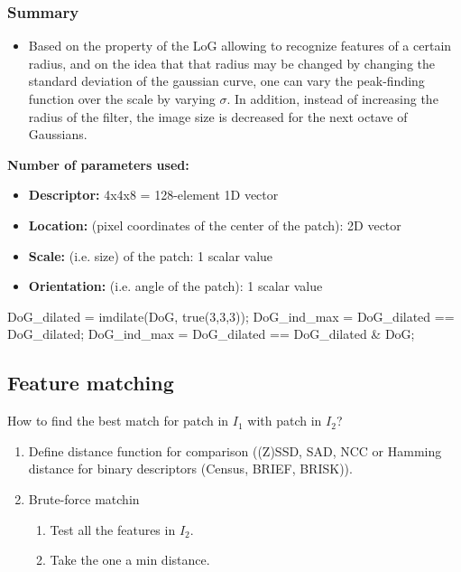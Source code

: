 \documentclass[10pt,a4paper]{scrartcl}
\begin{document}
\begin{multicols*}{2}
\subsubsection{Summary}

\begin{itemize}
\item Based on the property of the LoG allowing to recognize features of a certain radius, and on the idea that that radius may be changed by changing the standard deviation of the gaussian curve, one can vary the peak-finding function over the scale by varying $\sigma$. In addition, instead of increasing the radius of the filter, the image size is decreased for the next octave of Gaussians.
\end{itemize}

\textbf{Number of parameters used:}

\begin{itemize}
\item \textbf{Descriptor:} 4x4x8 = 128-element 1D vector
\item \textbf{Location:} (pixel coordinates of the center of the patch): 2D vector
\item \textbf{Scale:} (i.e. size) of the patch: 1 scalar value
\item \textbf{Orientation:} (i.e. angle of the patch): 1 scalar value
\end{itemize}

\begin{TPMatlab}
DoG_dilated = imdilate(DoG, true(3,3,3));
DoG_ind_max = DoG_dilated == DoG_dilated;
DoG_ind_max = DoG_dilated == DoG_dilated & DoG;
\end{TPMatlab}

\subsection{Feature matching}

How to find the best match for patch in $I_1$ with patch in $I_2$?

\begin{enumerate}
\item Define distance function for comparison ((Z)SSD, SAD, NCC or Hamming distance for binary descriptors (Census, BRIEF, BRISK)).
\item Brute-force matchin
\begin{enumerate}
\item Test all the features in $I_2$.
\item Take the one a min distance.
\end{enumerate}
\end{enumerate}


\end{multicols*}
\end{document}
